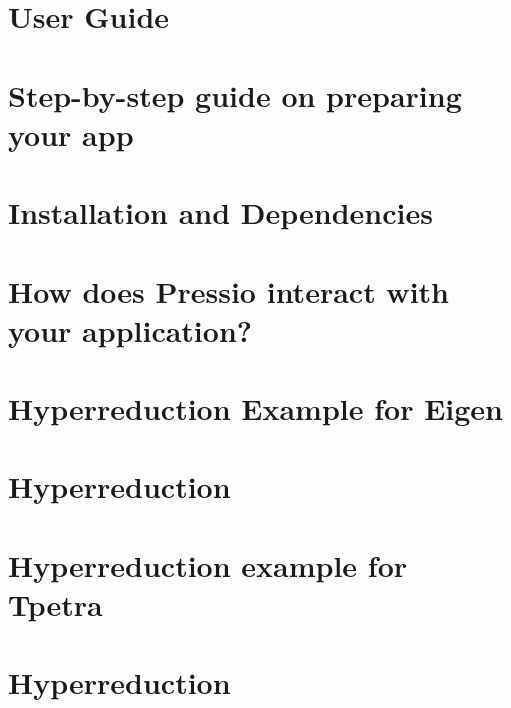 \let\mypdfximage\pdfximage\def\pdfximage{\immediate\mypdfximage}\documentclass[twoside]{book}
\newcommand{\+}{\discretionary{\mbox{\scriptsize$\hookleftarrow$}}{}{}}
\begin{document}
\chapter{User Guide}
\label{md_pages_get_started}

\chapter{Step-\/by-\/step guide on preparing your app}
\label{md_pages_getstarted_adapting_app}

\chapter{Installation and Dependencies}
\label{md_pages_getstarted_build_and_install}

\chapter{How does Pressio interact with your application?}
\label{md_pages_getstarted_pressio_app}

\chapter{Hyperreduction Example for Eigen}
\label{md_pages_hyperreduction_hyperred_eigen_example}

\chapter{Hyperreduction}
\label{md_pages_hyperreduction_hyperred_how_to_enable}

\chapter{Hyperreduction example for Tpetra}
\label{md_pages_hyperreduction_hyperred_tpetra_example}

\chapter{Hyperreduction}
\label{md_pages_hyperreduction}

\end{document}
